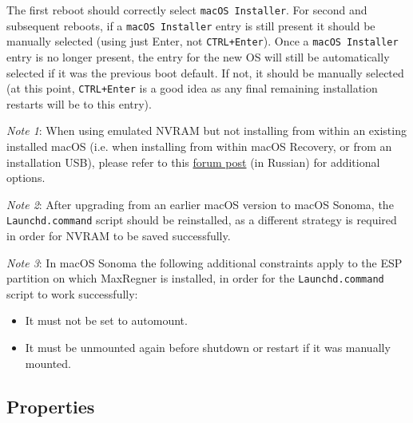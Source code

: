 \documentclass[]{article}
\makeatletter
\providecommand{\tightlist}{%
  \setlength{\itemsep}{0pt}\setlength{\parskip}{0pt}}
\renewcommand{\label}[1]{%
\zref@wrapper@immediate{\oldlabel{#1}}}  %
\makeatother
\begin{document}
The first reboot should correctly select \texttt{macOS Installer}. For second and subsequent reboots, if a \texttt{macOS Installer}
entry is still present it should be manually selected (using just Enter, not \texttt{CTRL+Enter}). Once a \texttt{macOS Installer}
entry is no longer present, the entry for the new OS will still be automatically selected if it was the previous boot default.
If not, it should be manually selected (at this point, \texttt{CTRL+Enter} is a good idea as any final remaining installation restarts
will be to this entry).

\emph{Note 1}: When using emulated NVRAM but not installing from within an existing installed macOS (i.e. when installing from
within macOS Recovery, or from an installation USB), please refer to this
\href{https://applelife.ru/posts/916248}{forum post} (in Russian)
for additional options.

\emph{Note 2}: After upgrading from an earlier macOS version to macOS Sonoma, the \texttt{Launchd.command} script should be
reinstalled, as a different strategy is required in order for NVRAM to be saved successfully.

\emph{Note 3}: In macOS Sonoma the following additional constraints apply to the ESP partition on which
MaxRegner is installed, in order for the \texttt{Launchd.command} script to work successfully:

\begin{itemize}
\tightlist
 \item It must not be set to automount.
 \item It must be unmounted again before shutdown or restart if it was manually mounted.
\end{itemize}

\subsection{Properties}\label{uefiprops}
\end{document}
